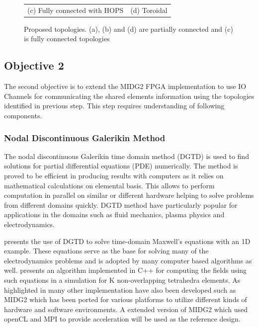 \documentclass[english,notitlepage]{hgbreport}
\begin{document}
\begin{figure}[h]
\begin{tabular}{c@{\hskip 0.5in}c}
		(c) Fully connected with HOPS & (d) Toroidal
	\end{tabular}
	\caption{Proposed topologies. (a), (b) and (d) are partially connected and (c) is
	fully connected topologies} 
	\label{fig:topologies}
\end{figure}

\subsection{Objective 2}

The second objective is to extend the MIDG2 FPGA implementation to use IO Channels for communicating
the shared elements information using the topologies identified in previous step.
This step requires understanding of following components.

\subsubsection{Nodal Discontinuous Galerikin Method}	%

The nodal discontinuous Galerikin time domain method (DGTD) \cite{hesthaven_nodal_2008} is used to find solutions
for partial differential equations (PDE) numerically. The method is proved to be efficient in
producing results with computers as it relies on mathematical calculations on elemental basis.
This allows to perform computation in parallel on similar or different hardware helping to
solve problems from different domains quickly. DGTD method have particularly popular for applications
in the domains such as fluid mechanics, plasma physics and electrodynamics.

\textcite{Hesthaven_190449} presents the use of DGTD to solve time-domain Maxwell's equations with an 1D example.
These equations serve as the base for solving many of the electrodynamics problems and is adopted by
many computer based algorithms as well. \cite{} presents an algorithm implemented in C++ for computing
the fields using such equations in a simulation for K non-overlapping tetrahedra elements. As highlighted 
in \cite{} many other implementation have also been developed such as MIDG2
which has been ported for various platforms to utilize different kinds of hardware and software environments.
A extended version of MIDG2 which used openCL and MPI to provide acceleration will be used as the reference design.
\end{document}

